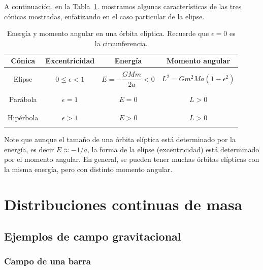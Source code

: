 A continuación, en la Tabla~\ref{tab:conicas-interpretacion}. mostramos algunas características de las tres cónicas mostradas, enfatizando en el caso particular de la elipse. 
\begin{table}[h]
\begin{center}
\begin{tabular}{|c|c|c|c|}
\hline
Cónica & Excentricidad & Energía & Momento angular \\
\hline
&&&\\
Elipse & $0\leq\epsilon<1$ & $E=-\dfrac{GMm}{2a} < 0$& $L^2=Gm^2Ma(1-\epsilon^2)$\\
&&&\\
\hline
&&&\\ 
Parábola & $\epsilon=1$ & $E= 0$& $L>0$\\
&&&\\
\hline
&&&\\ 
Hipérbola & $\epsilon>1$ & $E> 0$& $L>0$\\
&&&\\
\hline
\end{tabular}
\end{center}
\caption{Energía y momento angular en una órbita elíptica. Recuerde que $\epsilon=0$ es la circunferencia.}
\label{tab:conicas-interpretacion}
\end{table} 
Note que aunque el tamaño de una órbita elíptica está determinado por la energía, es decir $E\approx -1 /a$, la forma de la elipse (excentricidad) está determinado por el momento angular. En general, se pueden tener muchas órbitas elípticas con la misma energía, pero con distinto momento angular. 
 
 
 
 
 
 
 
 
 
 
 
 
 
 
 
 
\section{Distribuciones continuas de masa}


\subsection{Ejemplos de campo gravitacional}

\subsubsection{Campo de una barra}

